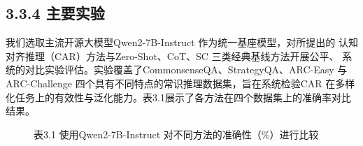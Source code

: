 \documentclass[12pt,a4paper,openright,UTF8]{ctexbook}
\begin{document}
\subsection{3.3.4 主要实验}

我们选取主流开源大模型Qwen2-7B-Instruct 作为统一基座模型，对所提出的 认知对齐推理（CAR）方法与Zero-Shot、CoT、SC 三类经典基线方法开展公平、 系统的对比实验评估。实验覆盖了CommonsenseQA、StrategyQA、ARC-Easy 与 ARC-Challenge 四个具有不同特点的常识推理数据集，旨在系统检验CAR 在多样 化任务上的有效性与泛化能力。表3.1展示了各方法在四个数据集上的准确率对比 结果。

\begin{figure}[htbp]
\centering
{}
\caption{表3.1 使用Qwen2-7B-Instruct 对不同方法的准确性（\%）进行比较}
\end{figure}
\end{document}
